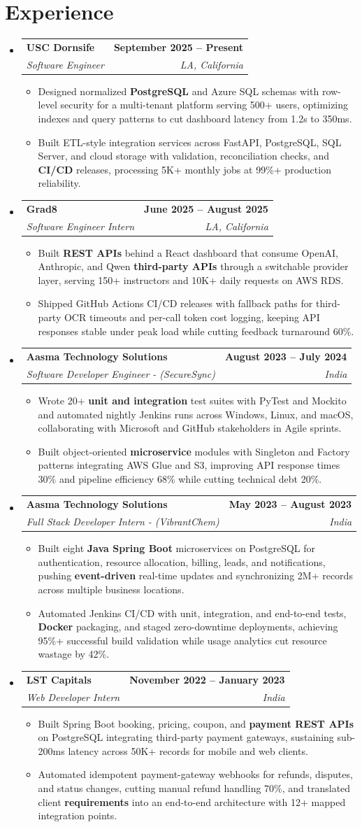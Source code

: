 \documentclass[letterpaper,10pt]{article}
\makeatletter
\newcommand{\itemTail}{\vspace{-4pt}}
\newcommand{\sectionGap}{\vspace{-8pt}}
\newcommand{\roleGap}{\vspace{2pt}}
\newcommand{\resumeItem}[1]{\item\small{{#1 \itemTail}}}
\newcommand{\resumeSubheading}[4]{\vspace{-1pt}\item\begin{tabular*}{1.0\textwidth}[t]{l@{\extracolsep{\fill}}r}\textbf{#1} & \textbf{\small #2} \\\textit{\small#3} & \textit{\small #4} \\\end{tabular*}\vspace{-2pt}}
\newcommand{\resumeSubHeadingListStart}{\begin{itemize}[leftmargin=0.0in, label={}]}
\newcommand{\resumeSubHeadingListEnd}{\end{itemize}}
\newcommand{\resumeItemListStart}{\begin{itemize}[leftmargin=0.15in,label=\textbullet,itemsep=3pt,topsep=0pt,parsep=0pt,partopsep=0pt]}
\newcommand{\resumeItemListEnd}{\end{itemize}\vspace{-4pt}}
\makeatother
\begin{document}
\section{Experience}
\resumeSubHeadingListStart
\resumeSubheading{USC Dornsife}{September 2025 -- Present}{Software Engineer}{LA, California}
\resumeItemListStart
\resumeItem{Designed normalized \textbf{PostgreSQL} and Azure SQL schemas with row-level security for a multi-tenant platform serving 500+ users, optimizing indexes and query patterns to cut dashboard latency from 1.2s to 350ms.}
\resumeItem{Built ETL-style integration services across FastAPI, PostgreSQL, SQL Server, and cloud storage with validation, reconciliation checks, and \textbf{CI/CD} releases, processing 5K+ monthly jobs at 99\%+ production reliability.}
\resumeItemListEnd
\roleGap
\resumeSubheading{Grad8}{June 2025 -- August 2025}{Software Engineer Intern}{LA, California}
\resumeItemListStart
\resumeItem{Built \textbf{REST APIs} behind a React dashboard that consume OpenAI, Anthropic, and Qwen \textbf{third-party APIs} through a switchable provider layer, serving 150+ instructors and 10K+ daily requests on AWS RDS.}
\resumeItem{Shipped GitHub Actions CI/CD releases with fallback paths for third-party OCR timeouts and per-call token cost logging, keeping API responses stable under peak load while cutting feedback turnaround 60\%.}
\resumeItemListEnd
\roleGap
\resumeSubheading{Aasma Technology Solutions}{August 2023 -- July 2024}{Software Developer Engineer - (SecureSync)}{India}
\resumeItemListStart
\resumeItem{Wrote 20+ \textbf{unit and integration} test suites with PyTest and Mockito and automated nightly Jenkins runs across Windows, Linux, and macOS, collaborating with Microsoft and GitHub stakeholders in Agile sprints.}
\resumeItem{Built object-oriented \textbf{microservice} modules with Singleton and Factory patterns integrating AWS Glue and S3, improving API response times 30\% and pipeline efficiency 68\% while cutting technical debt 20\%.}
\resumeItemListEnd
\roleGap
\resumeSubheading{Aasma Technology Solutions}{May 2023 -- August 2023}{Full Stack Developer Intern - (VibrantChem)}{India}
\resumeItemListStart
\resumeItem{Built eight \textbf{Java Spring Boot} microservices on PostgreSQL for authentication, resource allocation, billing, leads, and notifications, pushing \textbf{event-driven} real-time updates and synchronizing 2M+ records across multiple business locations.}
\resumeItem{Automated Jenkins CI/CD with unit, integration, and end-to-end tests, \textbf{Docker} packaging, and staged zero-downtime deployments, achieving 95\%+ successful build validation while usage analytics cut resource wastage by 42\%.}
\resumeItemListEnd
\roleGap
\resumeSubheading{LST Capitals}{November 2022 -- January 2023}{Web Developer Intern}{India}
\resumeItemListStart
\resumeItem{Built Spring Boot booking, pricing, coupon, and \textbf{payment REST APIs} on PostgreSQL integrating third-party payment gateways, sustaining sub-200ms latency across 50K+ records for mobile and web clients.}
\resumeItem{Automated idempotent payment-gateway webhooks for refunds, disputes, and status changes, cutting manual refund handling 70\%, and translated client \textbf{requirements} into an end-to-end architecture with 12+ mapped integration points.}
\resumeItemListEnd
\resumeSubHeadingListEnd
\sectionGap
\end{document}
